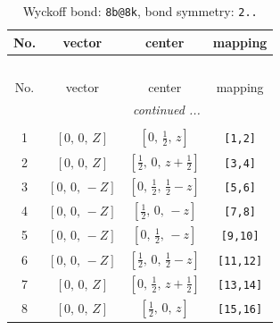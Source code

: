 \documentclass[fleqn,8pt]{jsarticle}
\begin{document}
\begin{longtable}{cccc}
\caption{Wyckoff bond: {\tt 8b@8k}, bond symmetry: {\tt 2..}}
 \\
 \hline \hline
No. & vector & center & mapping \\ \hline \endfirsthead

\multicolumn{3}{l}{\tablename\ \thetable{}} \\
 \hline \hline
No. & vector & center & mapping \\ \hline \endhead

 \hline \hline
\multicolumn{3}{r}{\footnotesize\it continued ...} \\ \endfoot

 \hline \hline
\multicolumn{3}{r}{} \\ \endlastfoot

1 & $\left[ 0,\, 0,\, Z \right]$ & $\left[ 0,\, \frac{1}{2},\, z \right]$ & {\tt [1,2]} \\ \hline
2 & $\left[ 0,\, 0,\, Z \right]$ & $\left[ \frac{1}{2},\, 0,\, z + \frac{1}{2} \right]$ & {\tt [3,4]} \\ \hline
3 & $\left[ 0,\, 0,\, - Z \right]$ & $\left[ 0,\, \frac{1}{2},\, \frac{1}{2} - z \right]$ & {\tt [5,6]} \\ \hline
4 & $\left[ 0,\, 0,\, - Z \right]$ & $\left[ \frac{1}{2},\, 0,\, - z \right]$ & {\tt [7,8]} \\ \hline
5 & $\left[ 0,\, 0,\, - Z \right]$ & $\left[ 0,\, \frac{1}{2},\, - z \right]$ & {\tt [9,10]} \\ \hline
6 & $\left[ 0,\, 0,\, - Z \right]$ & $\left[ \frac{1}{2},\, 0,\, \frac{1}{2} - z \right]$ & {\tt [11,12]} \\ \hline
7 & $\left[ 0,\, 0,\, Z \right]$ & $\left[ 0,\, \frac{1}{2},\, z + \frac{1}{2} \right]$ & {\tt [13,14]} \\ \hline
8 & $\left[ 0,\, 0,\, Z \right]$ & $\left[ \frac{1}{2},\, 0,\, z \right]$ & {\tt [15,16]} \\
\end{longtable}
\renewcommand{\arraystretch}{1.2}
\end{document}
